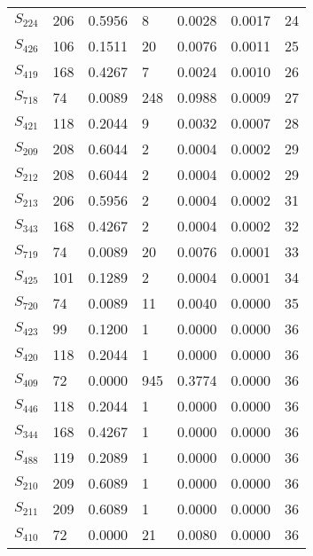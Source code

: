 \begin{xltabular}{\textwidth}{XXXXXXX}
  $S_{224}$ & 206 & 0.5956 & 8 & 0.0028 & 0.0017 & 24 \\ 
  $S_{426}$ & 106 & 0.1511 & 20 & 0.0076 & 0.0011 & 25 \\ 
  $S_{419}$ & 168 & 0.4267 & 7 & 0.0024 & 0.0010 & 26 \\ 
  $S_{718}$ & 74 & 0.0089 & 248 & 0.0988 & 0.0009 & 27 \\ 
  $S_{421}$ & 118 & 0.2044 & 9 & 0.0032 & 0.0007 & 28 \\ 
  $S_{209}$ & 208 & 0.6044 & 2 & 0.0004 & 0.0002 & 29 \\ 
  $S_{212}$ & 208 & 0.6044 & 2 & 0.0004 & 0.0002 & 29 \\ 
  $S_{213}$ & 206 & 0.5956 & 2 & 0.0004 & 0.0002 & 31 \\ 
  $S_{343}$ & 168 & 0.4267 & 2 & 0.0004 & 0.0002 & 32 \\ 
  $S_{719}$ & 74 & 0.0089 & 20 & 0.0076 & 0.0001 & 33 \\ 
  $S_{425}$ & 101 & 0.1289 & 2 & 0.0004 & 0.0001 & 34 \\ 
  $S_{720}$ & 74 & 0.0089 & 11 & 0.0040 & 0.0000 & 35 \\ 
  $S_{423}$ & 99 & 0.1200 & 1 & 0.0000 & 0.0000 & 36 \\ 
  $S_{420}$ & 118 & 0.2044 & 1 & 0.0000 & 0.0000 & 36 \\ 
  $S_{409}$ & 72 & 0.0000 & 945 & 0.3774 & 0.0000 & 36 \\ 
  $S_{446}$ & 118 & 0.2044 & 1 & 0.0000 & 0.0000 & 36 \\ 
  $S_{344}$ & 168 & 0.4267 & 1 & 0.0000 & 0.0000 & 36 \\ 
  $S_{488}$ & 119 & 0.2089 & 1 & 0.0000 & 0.0000 & 36 \\ 
  $S_{210}$ & 209 & 0.6089 & 1 & 0.0000 & 0.0000 & 36 \\ 
  $S_{211}$ & 209 & 0.6089 & 1 & 0.0000 & 0.0000 & 36 \\ 
  $S_{410}$ & 72 & 0.0000 & 21 & 0.0080 & 0.0000 & 36 \\
        \bottomrule
    \end{xltabular}
    